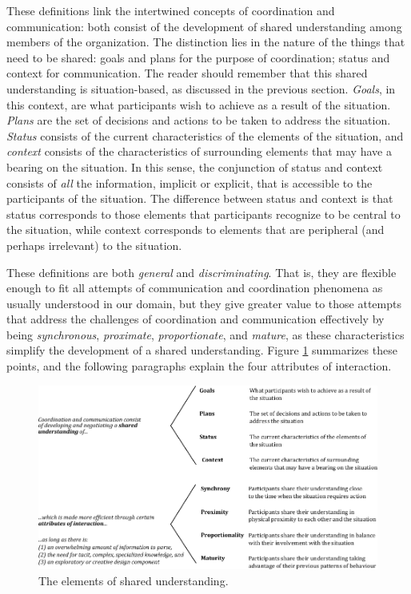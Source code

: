 These definitions link the intertwined concepts of coordination and communication: both consist of the development of shared understanding among members of the organization. The distinction lies in the nature of the things that need to be shared: goals and plans for the purpose of coordination; status and context for communication. The reader should remember that this shared understanding is situation-based, as discussed in the previous section. \emph{Goals}, in this context, are what participants wish to achieve as a result of the situation. \emph{Plans} are the set of decisions and actions to be taken to address the situation. \emph{Status} consists of the current characteristics of the elements of the situation, and \emph{context} consists of the characteristics of surrounding elements that may have a bearing on the situation. In this sense, the conjunction of status and context consists of \emph{all} the information, implicit or explicit, that is accessible to the participants of the situation. The difference between status and context is that status corresponds to those elements that participants recognize to be central to the situation, while context corresponds to elements that are peripheral (and perhaps irrelevant) to the situation.

These definitions are both \emph{general} and \emph{discriminating}. That is, they are flexible enough to fit all attempts of communication and coordination phenomena as usually understood in our domain, but they give greater value to those attempts that address the challenges of coordination and communication effectively by being \emph{synchronous}, \emph{proximate}, \emph{proportionate}, and \emph{mature}, as these characteristics simplify the development of a shared understanding. Figure \ref{fig:Schema} summarizes these points, and the following paragraphs explain the four attributes of interaction.

\begin{figure}[tb]
\centering
\includegraphics[scale=1.0]{su-schema}
\caption{\label{fig:Schema}The elements of shared understanding.}
\end{figure}



